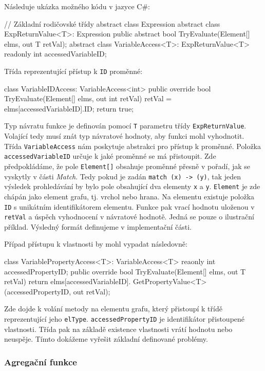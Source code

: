 Následuje ukázka možného kódu v jazyce C\#:
\begin{code}
// Základní rodičovské třídy
abstract class Expression { }
abstract class ExpReturnValue<T>: Expression {
  public abstract bool TryEvaluate(Element[] elms, out T retVal); 
}
abstract class VariableAccess<T>: ExpReturnValue<T> {
     readonly int accessedVariableID; }
\end{code}

Třída reprezentující přístup k \verb+ID+ proměnné:
\begin{code}
class VariableIDAccess: VariableAccess<int> {
  public override bool TryEvaluate(Element[] elms, out int retVal) {
     retVal = elms[accessedVariableID].ID;
     return true; } }
\end{code}
Typ návratu funkce je definován pomocí \texttt{T} parametru třídy \texttt{ExpReturnValue}.
Volající tedy musí znát typ návratové hodnoty, aby funkci mohl vyhodnotit.
Třída \verb+VariableAccess+ nám poskytuje abstrakci pro přístup k proměnné.
Položka \verb+accessedVariableID+ určuje k jaké proměnné se má přistoupit.
Zde předpokládáme, že pole \verb+Element[]+ obsahuje proměnné přesně v pořadí, jak se vyskytly v části \textit{Match}.
Tedy pokud je zadán \texttt{match (x) -> (y)}, tak jeden výsledek prohledávání by bylo pole obsahující dva elementy \texttt{x} a \texttt{y}.
\texttt{Element} je zde chápán jako element grafu, tj. vrchol nebo hrana.
Na elementu existuje položka \texttt{ID} s unikátním identifikátorem elementu.
Funkce pak vrací hodnotu uloženou v \texttt{retVal} a úspěch vyhodnocení v návratové hodnotě. 
Jedná se pouze o ilustrační příklad. 
Výsledný formát definujeme v implementační části.

Případ přístupu k vlastnosti by mohl vypadat následovně:
\begin{code}
class VariablePropertyAccess<T>: VariableAccess<T> {
  reaonly int accessedPropertyID; 
  public override bool TryEvaluate(Element[] elms, out T retVal) {
    return elms[accessedVariableID].
               GetPropertyValue<T>(accessedPropertyID, out retVal);
  }
}
\end{code}
Zde dojde k volání metody na elementu grafu, který přistoupí k třídě reprezentující jeho \verb+elType+.
\texttt{accessedPropertyID} je identifikátor přistoupené vlastnosti.
Třída pak na základě existence vlastnosti vrátí hodnotu nebo neuspěje.
Tímto dokážeme vyřešit základní definované problémy.

\subsubsection{Agregační funkce}

